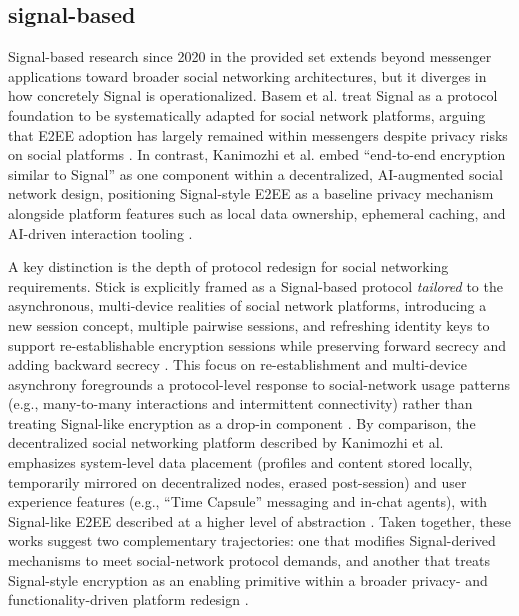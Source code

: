 \subsection{signal-based}
Signal-based research since 2020 in the provided set extends beyond messenger applications toward broader social networking architectures, but it diverges in how concretely Signal is operationalized. Basem et al. treat Signal as a protocol foundation to be systematically adapted for social network platforms, arguing that E2EE adoption has largely remained within messengers despite privacy risks on social platforms \cite{basem2023}. In contrast, Kanimozhi et al. embed ``end-to-end encryption similar to Signal'' as one component within a decentralized, AI-augmented social network design, positioning Signal-style E2EE as a baseline privacy mechanism alongside platform features such as local data ownership, ephemeral caching, and AI-driven interaction tooling \cite{kanimozhi2025}.

A key distinction is the depth of protocol redesign for social networking requirements. Stick is explicitly framed as a Signal-based protocol \emph{tailored} to the asynchronous, multi-device realities of social network platforms, introducing a new session concept, multiple pairwise sessions, and refreshing identity keys to support re-establishable encryption sessions while preserving forward secrecy and adding backward secrecy \cite{basem2023}. This focus on re-establishment and multi-device asynchrony foregrounds a protocol-level response to social-network usage patterns (e.g., many-to-many interactions and intermittent connectivity) rather than treating Signal-like encryption as a drop-in component \cite{basem2023}. By comparison, the decentralized social networking platform described by Kanimozhi et al. emphasizes system-level data placement (profiles and content stored locally, temporarily mirrored on decentralized nodes, erased post-session) and user experience features (e.g., ``Time Capsule'' messaging and in-chat agents), with Signal-like E2EE described at a higher level of abstraction \cite{kanimozhi2025}. Taken together, these works suggest two complementary trajectories: one that modifies Signal-derived mechanisms to meet social-network protocol demands, and another that treats Signal-style encryption as an enabling primitive within a broader privacy- and functionality-driven platform redesign \cite{basem2023,kanimozhi2025}.

